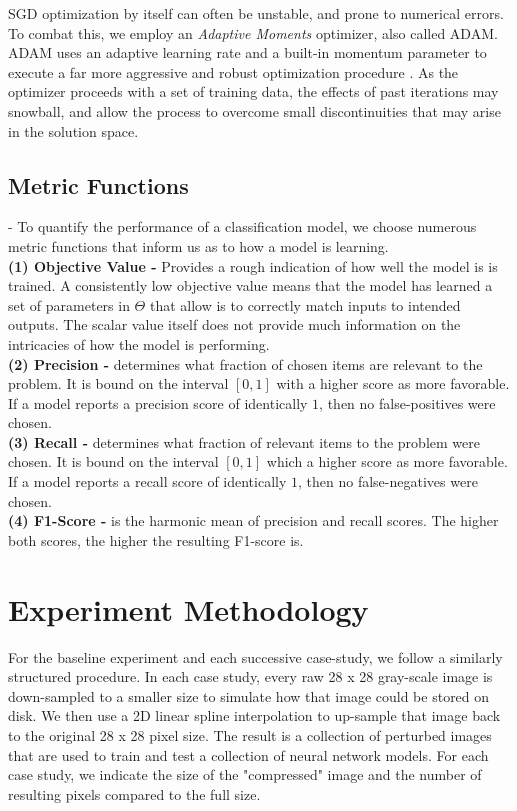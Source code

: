\documentclass{IEEEtran}
\begin{document}
SGD optimization by itself can often be unstable, and prone to numerical errors. To combat this, we employ an \textit{Adaptive Moments} optimizer, also called ADAM. ADAM uses an adaptive learning rate and a built-in momentum parameter to execute a far more aggressive and robust optimization procedure \cite{Goodfellow}. As the optimizer proceeds with a set of training data, the effects of past iterations may snowball, and allow the process to overcome small discontinuities that may arise in the solution space.

\subsection{Metric Functions} -
To quantify the performance of a classification model, we choose numerous metric functions that inform us as to how a model is learning. \\
\textbf{ (1) Objective Value - } Provides a rough indication of how well the model is is trained. A consistently low objective value means that the model has learned a set of parameters in $\Theta$ that allow is to correctly match inputs to intended outputs. The scalar value itself does not provide much information on the intricacies of how the model is performing. \\
\textbf{(2) Precision - } determines what fraction of chosen items are relevant to the problem. It is bound on the interval $[0,1]$ with a higher score as more favorable. If a model reports a precision score of identically $1$, then no false-positives were chosen. \\
\textbf{(3) Recall - } determines what fraction of relevant items to the problem were chosen. It is bound on the interval $[0,1]$ which a higher score as more favorable. If a model reports a recall score of identically $1$, then no false-negatives were chosen. \\
\textbf{(4) F1-Score - } is the harmonic mean of precision and recall scores. The higher both scores, the higher the resulting F1-score is. 

\section{Experiment Methodology}
For the baseline experiment and each successive case-study, we follow a similarly structured procedure. In each case study, every raw 28 x 28 gray-scale image is down-sampled to a smaller size to simulate how that image could be stored on disk. We then use a 2D linear spline interpolation to up-sample that image back to the original 28 x 28 pixel size. The result is a collection of perturbed images that are used to train and test a collection of neural network models. For each case study, we indicate the size of the "compressed" image and the number of resulting pixels compared to the full size.
\end{document}
